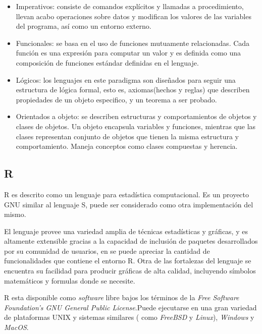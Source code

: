\begin{itemize}
	\begin{itemize}
	\item Imperativos: consiste de comandos explícitos y llamadas a procedimiento, llevan acabo operaciones sobre datos y modifican  los valores de las variables del programa, así como un entorno externo.\cite{dimilter}
    \item Funcionales: se basa en el uso de funciones mutuamente relacionadas. Cada función es una expresión para computar un valor y es definida como una composición de funciones estándar definidas en el lenguaje.\cite{dimilter}
    \item Lógicos: los lenguajes en este paradigma son diseñados para seguir una estructura de lógica formal, esto es, axiomas(hechos y reglas) que describen propiedades de un objeto especifico, y un teorema a ser probado.\cite{dimilter}
    \item Orientados a objeto: se describen estructuras y comportamientos de objetos y clases de objetos. Un objeto encapsula variables y funciones, mientras que las clases representan conjunto de objetos que tienen la misma estructura y comportamiento. Maneja conceptos como clases compuestas y herencia.\cite{dimilter}
	\end{itemize}
\end{itemize}

\subsection{R}

R es descrito como un lenguaje para estadística computacional. Es un proyecto GNU similar al lenguaje S, puede ser considerado como otra implementación del mismo.\cite{rproject}

El lenguaje provee  una variedad amplia de técnicas estadísticas y gráficas, y es altamente extensible gracias a la capacidad de inclusión de paquetes desarrollados por su comunidad de usuarios, en \cite{24-josemy} se puede apreciar la cantidad de funcionalidades que contiene el entorno R. Otra de las fortalezas del lenguaje se encuentra su facilidad para producir gráficas de alta calidad, incluyendo símbolos matemáticos y formulas donde se necesite.\cite{rproject}

R  esta disponible como \emph{software} libre bajos los términos de la \emph{Free Software Foundation’s GNU General Public License}.Puede ejecutarse en una gran variedad de plataformas UNIX y sistemas similares ( como \emph{FreeBSD}  y \emph{Linux}), \emph{Windows} y \emph{MacOS}.\cite{rproject}



